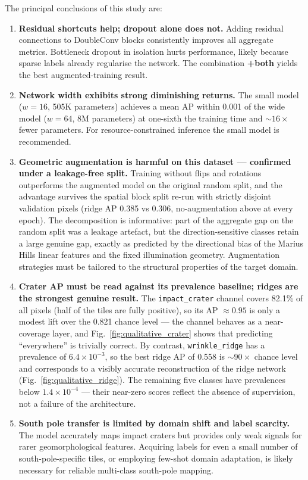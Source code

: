 The principal conclusions of this study are:

\begin{enumerate}
    \item \textbf{Residual shortcuts help; dropout alone does not.} Adding residual connections to DoubleConv blocks consistently improves all aggregate metrics. Bottleneck dropout in isolation hurts performance, likely because sparse labels already regularise the network. The combination \textbf{+both} yields the best augmented-training result.

    \item \textbf{Network width exhibits strong diminishing returns.} The small model ($w=16$, 505K parameters) achieves a mean AP within 0.001 of the wide model ($w=64$, 8M parameters) at one-sixth the training time and ${\sim}16\times$ fewer parameters. For resource-constrained inference the small model is recommended.

    \item \textbf{Geometric augmentation is harmful on this dataset — confirmed under a leakage-free split.} Training without flips and rotations outperforms the augmented model on the original random split, and the advantage survives the spatial block split re-run with strictly disjoint validation pixels (ridge AP 0.385 vs 0.306, no-augmentation above at every epoch). The decomposition is informative: part of the aggregate gap on the random split was a leakage artefact, but the direction-sensitive classes retain a large genuine gap, exactly as predicted by the directional bias of the Marius Hills linear features and the fixed illumination geometry. Augmentation strategies must be tailored to the structural properties of the target domain.

    \item \textbf{Crater AP must be read against its prevalence baseline; ridges are the strongest genuine result.} The \texttt{impact\_crater} channel covers 82.1\% of all pixels (half of the tiles are fully positive), so its AP $\approx 0.95$ is only a modest lift over the 0.821 chance level — the channel behaves as a near-coverage layer, and Fig.~\ref{fig:qualitative_crater} shows that predicting ``everywhere'' is trivially correct. By contrast, \texttt{wrinkle\_ridge} has a prevalence of $6.4\times10^{-3}$, so the best ridge AP of 0.558 is ${\sim}90\times$ chance level and corresponds to a visibly accurate reconstruction of the ridge network (Fig.~\ref{fig:qualitative_ridge}). The remaining five classes have prevalences below $1.4\times10^{-4}$ — their near-zero scores reflect the absence of supervision, not a failure of the architecture.

    \item \textbf{South pole transfer is limited by domain shift and label scarcity.} The model accurately maps impact craters but provides only weak signals for rarer geomorphological features. Acquiring labels for even a small number of south-pole-specific tiles, or employing few-shot domain adaptation, is likely necessary for reliable multi-class south-pole mapping.
\end{enumerate}

